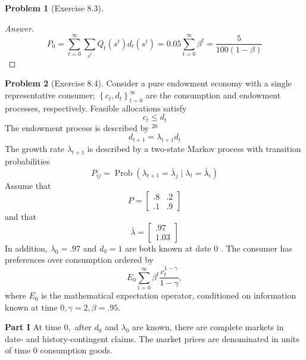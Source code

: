 \documentclass[12pt]{article}
\theoremstyle{definition}
\newtheorem{problem}{Problem}
\begin{document}
\begin{problem}[Exercise 8.3]
\begin{proof}[Answer]
$$P_0 = \sum_{t=0}^\infty \sum_{s^t} Q_t(s^t)d_t(s^t) = 0.05 \sum_{t=0}^\infty \beta^{t} = \frac{5}{100(1-\beta)}$$ 

\end{proof}
\end{problem}

\begin{problem}[Exercise 8.4] Consider a pure endowment economy with a single representative consumer; $\left\{c_{t}, d_{t}\right\}_{t=0}^{\infty}$ are the consumption and endowment processes, respectively. Feasible allocations satisfy
$$
c_{t} \leq d_{t}
$$
The endowment process is described by $^{20}$
$$
d_{t+1}=\lambda_{t+1} d_{t}
$$
The growth rate $\lambda_{t+1}$ is described by a two-state Markov process with transition probabilities
$$
P_{i j}=\operatorname{Prob}\left(\lambda_{t+1}=\bar{\lambda}_{j} \mid \lambda_{t}=\bar{\lambda}_{i}\right)
$$
Assume that
$$
P=\left[\begin{array}{ll}
.8 & .2 \\
.1 & .9
\end{array}\right]
$$
and that
$$
\bar{\lambda}=\left[\begin{array}{c}
.97 \\
1.03
\end{array}\right]
$$
In addition, $\lambda_{0}=.97$ and $d_{0}=1$ are both known at date 0 . The consumer has preferences over consumption ordered by
$$
E_{0} \sum_{t=0}^{\infty} \beta^{t} \frac{c_{t}^{1-\gamma}}{1-\gamma},
$$
where $E_{0}$ is the mathematical expectation operator, conditioned on information known at time $0, \gamma=2, \beta=.95$.

\textbf{Part I}
At time $0,$ after $d_{0}$ and $\lambda_{0}$ are known, there are complete markets in date- and history-contingent claims. The market prices are denominated in units of time $0$ consumption goods.


\end{problem}
\end{document}
